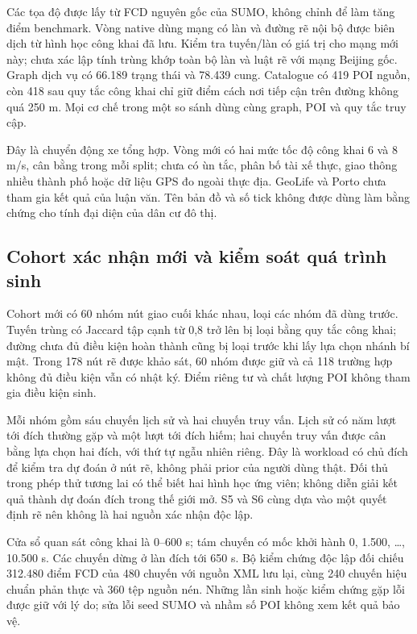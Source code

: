 Các tọa độ được lấy từ FCD nguyên gốc của SUMO, không chỉnh để làm tăng điểm benchmark. Vòng native dùng mạng có làn và đường rẽ nội bộ được biên dịch từ hình học công khai đã lưu. Kiểm tra tuyến/làn có giá trị cho mạng mới này; chưa xác lập tính trùng khớp toàn bộ làn và luật rẽ với mạng Beijing gốc. Graph dịch vụ có 66.189 trạng thái và 78.439 cung. Catalogue có 419 POI nguồn, còn 418 sau quy tắc công khai chỉ giữ điểm cách nơi tiếp cận trên đường không quá 250 m. Mọi cơ chế trong một so sánh dùng cùng graph, POI và quy tắc truy cập.

Đây là chuyển động xe tổng hợp. Vòng mới có hai mức tốc độ công khai 6 và 8 m/s, cân bằng trong mỗi split; chưa có ùn tắc, phân bố tài xế thực, giao thông nhiều thành phố hoặc dữ liệu GPS đo ngoài thực địa. GeoLife và Porto chưa tham gia kết quả của luận văn. Tên bản đồ và số tick không được dùng làm bằng chứng cho tính đại diện của dân cư đô thị.

\subsection{Cohort xác nhận mới và kiểm soát quá trình sinh}

Cohort mới có 60 nhóm nút giao cuối khác nhau, loại các nhóm đã dùng trước. Tuyến trùng có Jaccard tập cạnh từ 0,8 trở lên bị loại bằng quy tắc công khai; đường chưa đủ điều kiện hoàn thành cũng bị loại trước khi lấy lựa chọn nhánh bí mật. Trong 178 nút rẽ được khảo sát, 60 nhóm được giữ và cả 118 trường hợp không đủ điều kiện vẫn có nhật ký. Điểm riêng tư và chất lượng POI không tham gia điều kiện sinh.

Mỗi nhóm gồm sáu chuyến lịch sử và hai chuyến truy vấn. Lịch sử có năm lượt tới đích thường gặp và một lượt tới đích hiếm; hai chuyến truy vấn được cân bằng lựa chọn hai đích, với thứ tự ngẫu nhiên riêng. Đây là workload có chủ đích để kiểm tra dự đoán ở nút rẽ, không phải prior của người dùng thật. Đối thủ trong phép thử tương lai có thể biết hai hình học ứng viên; không diễn giải kết quả thành dự đoán đích trong thế giới mở. S5 và S6 cùng dựa vào một quyết định rẽ nên không là hai nguồn xác nhận độc lập.

Cửa sổ quan sát công khai là 0--600 s; tám chuyến có mốc khởi hành 0, 1.500, \ldots, 10.500 s. Các chuyến dừng ở làn đích tới 650 s. Bộ kiểm chứng độc lập đối chiếu 312.480 điểm FCD của 480 chuyến với nguồn XML lưu lại, cùng 240 chuyến hiệu chuẩn phản thực và 360 tệp nguồn nén. Những lần sinh hoặc kiểm chứng gặp lỗi được giữ với lý do; sửa lỗi seed SUMO và nhầm số POI không xem kết quả bảo vệ.

